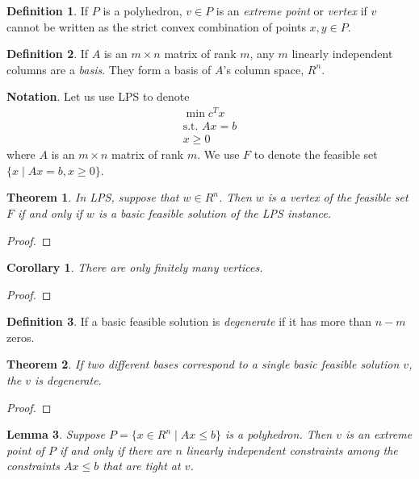 \documentclass[11pt]{article} %
\theoremstyle{plain}%
\newtheorem{thm}{Theorem}[section]
\newtheorem{lem}[thm]{Lemma}
\newtheorem*{cor}{Corollary}
\theoremstyle{definition}
\newtheorem{dfn}{Definition}[section]
\theoremstyle{remark}
\begin{document}
\begin{dfn}
If $P$ is a polyhedron, $v \in P$ is an \emph{extreme point} or \emph{vertex} 
if $v$ cannot be written as the strict convex combination of points $x, y \in P$. 
\end{dfn}

\begin{dfn}
If $A$ is an $m\times n$ matrix of rank $m$, any $m$ linearly independent columns are a
\emph{basis}. They form a basis of $A$'s column space, $R^n$. 
\end{dfn}

\textbf{Notation}. Let us use LPS to denote
\begin{align*}
\min c^T x\\
\text{s.t. } Ax = b\\
x \geq 0
\end{align*}
where $A$ is an $m\times n$ matrix of rank $m$. We use $F$ to denote the feasible set 
$\{x \mid Ax = b, x \geq 0\}$. 

\begin{thm}
In LPS, suppose that $w\in R^n$. Then $w$ is a vertex of the feasible set $F$ if and only if
$w$ is a basic feasible solution of the LPS instance. 
\end{thm}

\begin{proof}

\end{proof}

\begin{cor}
There are only finitely many vertices. 
\end{cor}

\begin{proof}

\end{proof}

\begin{dfn}
If a basic feasible solution is \emph{degenerate} if it has more than $n-m$ zeros. 
\end{dfn}

\begin{thm}
If two different bases correspond to a single basic feasible solution $v$, the $v$ is 
degenerate. 
\end{thm}

\begin{proof}

\end{proof}

\begin{lem}
Suppose $P = \{ x \in R^n \mid Ax \leq b \}$ is a polyhedron. Then $v$ is an extreme 
point of $P$ if and only if there are $n$ linearly independent constraints among the 
constraints $Ax \leq b$ that are tight at $v$. 
\end{lem}
\end{document}
